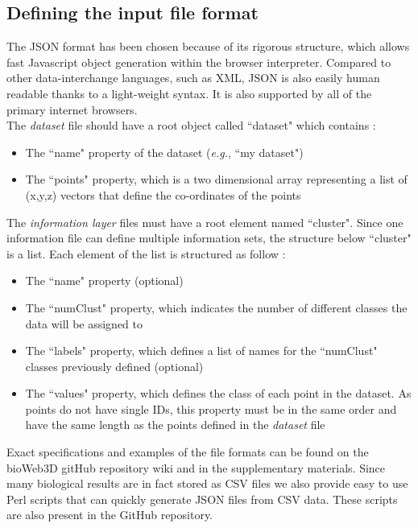 \documentclass{bioinfo}
\begin{document}
\subsection{Defining the input file format}
The JSON format has been chosen because of its rigorous structure, which allows fast Javascript object generation within the browser interpreter. Compared to other data-interchange languages, such as XML, JSON is also easily human readable thanks to a light-weight syntax. It is also supported by all of the primary internet browsers.\\
The {\it{dataset}} file should have a root object called ``dataset" which contains :
\begin{itemize}
\item The ``name" property of the dataset (\textit{e.g.}, ``my dataset") 
\item The ``points" property, which is a two dimensional array representing a list of (x,y,z) vectors that define the co-ordinates of the points
\end{itemize}

The {\it{information layer}} files must have a root element named  ``cluster". Since one information file can define multiple information sets, the structure below ``cluster" is a list. Each element of the list is structured as follow :
\begin{itemize}
\item The ``name" property (optional)
\item The ``numClust" property, which indicates the number of different classes the data will be assigned to
\item The ``labels" property, which defines a list of names for the ``numClust" classes previously defined (optional)
\item The ``values" property, which defines the class of each point in the dataset. As points do not have single IDs, this property must be in the same order and have the same length as the points defined in the {\it{dataset}} file
\end{itemize}
Exact specifications and examples of the file formats can be found on the bioWeb3D gitHub repository wiki and in the supplementary materials. Since many biological results are in fact stored as CSV files we also provide easy to use Perl scripts that can quickly generate JSON files from CSV data. These scripts are also present in the GitHub repository.
\end{document}
